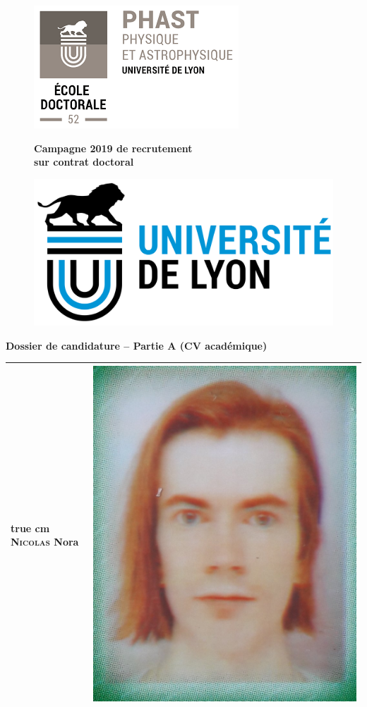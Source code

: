\documentclass[11pt,a4]{article}
\begin{document}

\begin{figure}
    \begin{minipage}[c]{.06\linewidth}
        \includegraphics[width = 3.5 true cm]{../phast-logo.png}
    \end{minipage} \hfill
    \begin{minipage}[c]{.66\linewidth}
        \begin{center}
            {\bf \Large Campagne 2019 de recrutement \\ sur contrat doctoral}
        \end{center}
    \end{minipage}
    \begin{minipage}[c]{.06\linewidth}
        \includegraphics[width = 3.5 true cm]{../UdL-logo.png}
    \end{minipage}
\end{figure}

\begin{center}
    {\bf \Large Dossier de candidature -- Partie A (CV académique)}
\end{center}


\begin{center}
    \begin{tabular}{|m{12cm}|m{4cm}|} \hline
    \vspace{1.5cm} {\hskip 5 true cm} \textsc{Nicolas} Nora \vspace{1.5cm}
    & \hspace{.7cm} \includegraphics[width = 2 cm]{../20190506_105901}
        \\ \hline
    \end{tabular}
\end{center}
\end{document}

